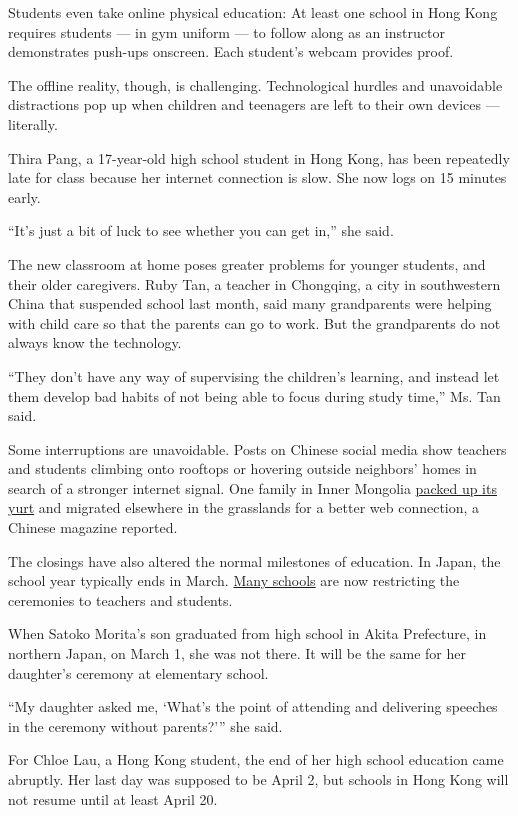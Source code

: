 Students even take online physical education: At least one school in
Hong Kong requires students --- in gym uniform --- to follow along as an
instructor demonstrates push-ups onscreen. Each student's webcam
provides proof.

The offline reality, though, is challenging. Technological hurdles and
unavoidable distractions pop up when children and teenagers are left to
their own devices --- literally.

Thira Pang, a 17-year-old high school student in Hong Kong, has been
repeatedly late for class because her internet connection is slow. She
now logs on 15 minutes early.

``It's just a bit of luck to see whether you can get in,'' she said.

The new classroom at home poses greater problems for younger students,
and their older caregivers. Ruby Tan, a teacher in Chongqing, a city in
southwestern China that suspended school last month, said many
grandparents were helping with child care so that the parents can go to
work. But the grandparents do not always know the technology.

``They don't have any way of supervising the children's learning, and
instead let them develop bad habits of not being able to focus during
study time,'' Ms. Tan said.

Some interruptions are unavoidable. Posts on Chinese social media show
teachers and students climbing onto rooftops or hovering outside
neighbors' homes in search of a stronger internet signal. One family in
Inner Mongolia \href{https://m.weibo.cn/status/4478077407118555?}{packed
up its yurt} and migrated elsewhere in the grasslands for a better web
connection, a Chinese magazine reported.

The closings have also altered the normal milestones of education. In
Japan, the school year typically ends in March.
\href{https://www.nytimes.com/2020/02/27/world/asia/japan-schools-coronavirus.html}{Many
schools} are now restricting the ceremonies to teachers and students.

When Satoko Morita's son graduated from high school in Akita Prefecture,
in northern Japan, on March 1, she was not there. It will be the same
for her daughter's ceremony at elementary school.

``My daughter asked me, `What's the point of attending and delivering
speeches in the ceremony without parents?''' she said.

For Chloe Lau, a Hong Kong student, the end of her high school education
came abruptly. Her last day was supposed to be April 2, but schools in
Hong Kong will not resume until at least April 20.

